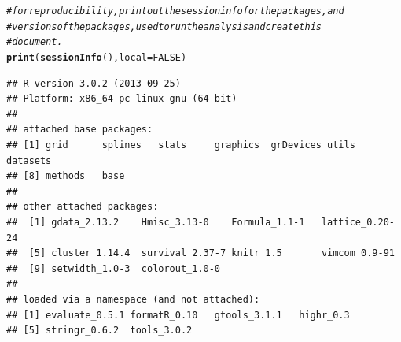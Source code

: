 \documentclass[letterpaper, 10pt]{article}\usepackage[]{graphicx}\usepackage[]{color}
\makeatletter
\newcommand{\hlnum}[1]{\textcolor[rgb]{0.686,0.059,0.569}{#1}}%
\newcommand{\hlcom}[1]{\textcolor[rgb]{0.678,0.584,0.686}{\textit{#1}}}%
\newcommand{\hlstd}[1]{\textcolor[rgb]{0.345,0.345,0.345}{#1}}%
\newcommand{\hlkwc}[1]{\textcolor[rgb]{0.333,0.667,0.333}{#1}}%
\newcommand{\hlkwd}[1]{\textcolor[rgb]{0.737,0.353,0.396}{\textbf{#1}}}%
\newenvironment{kframe}{%
 \def\at@end@of@kframe{}%
 \ifinner\ifhmode%
  \def\at@end@of@kframe{\end{minipage}}%
  \begin{minipage}{\columnwidth}%
 \fi\fi%
 \def\FrameCommand##1{\hskip\@totalleftmargin \hskip-\fboxsep
 \colorbox{shadecolor}{##1}\hskip-\fboxsep
     \hskip-\linewidth \hskip-\@totalleftmargin \hskip\columnwidth}%
 \MakeFramed {\advance\hsize-\width
   \@totalleftmargin\z@ \linewidth\hsize
   \@setminipage}}%
 {\par\unskip\endMakeFramed%
 \at@end@of@kframe}
\newenvironment{knitrout}{}{} %
\makeatother
\begin{document}
\begin{knitrout}
\color{fgcolor}\begin{kframe}
\begin{alltt}
\hlcom{# for reproducibility, print out the session info for the packages, and}
\hlcom{# versions of the packages, used to run the analysis and create this}
\hlcom{# document.}
\hlkwd{print}\hlstd{(}\hlkwd{sessionInfo}\hlstd{(),} \hlkwc{local} \hlstd{=} \hlnum{FALSE}\hlstd{)}
\end{alltt}
\begin{verbatim}
## R version 3.0.2 (2013-09-25)
## Platform: x86_64-pc-linux-gnu (64-bit)
## 
## attached base packages:
## [1] grid      splines   stats     graphics  grDevices utils     datasets 
## [8] methods   base     
## 
## other attached packages:
##  [1] gdata_2.13.2    Hmisc_3.13-0    Formula_1.1-1   lattice_0.20-24
##  [5] cluster_1.14.4  survival_2.37-7 knitr_1.5       vimcom_0.9-91  
##  [9] setwidth_1.0-3  colorout_1.0-0 
## 
## loaded via a namespace (and not attached):
## [1] evaluate_0.5.1 formatR_0.10   gtools_3.1.1   highr_0.3     
## [5] stringr_0.6.2  tools_3.0.2
\end{verbatim}
\end{kframe}
\end{knitrout}

\end{document}
